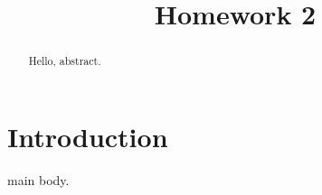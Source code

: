 \documentclass{acmtog}
\begin{document}
\title{Homework 2}
\maketitle
\begin{abstract}
Hello, abstract.
\end{abstract}

\section{Introduction}
main body.
\end{document}
